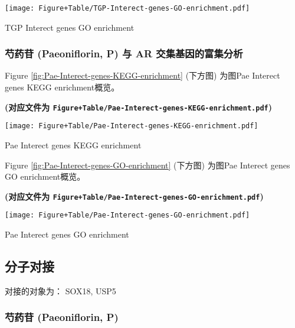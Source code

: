 \documentclass[
]{article}
\begin{document}
\def\@captype{figure}
\begin{center}
\texttt{[image: Figure+Table/TGP-Interect-genes-GO-enrichment.pdf]}
\caption{TGP Interect genes GO enrichment}\label{fig:TGP-Interect-genes-GO-enrichment}
\end{center}

\hypertarget{ux828dux836fux82f7-paeoniflorin-p-ux4e0e-ar-ux4ea4ux96c6ux57faux56e0ux7684ux5bccux96c6ux5206ux6790}{%
\subsubsection{芍药苷 (Paeoniflorin, P) 与 AR 交集基因的富集分析}\label{ux828dux836fux82f7-paeoniflorin-p-ux4e0e-ar-ux4ea4ux96c6ux57faux56e0ux7684ux5bccux96c6ux5206ux6790}}

Figure \ref{fig:Pae-Interect-genes-KEGG-enrichment} (下方图) 为图Pae Interect genes KEGG enrichment概览。

\textbf{(对应文件为 \texttt{Figure+Table/Pae-Interect-genes-KEGG-enrichment.pdf})}

\def\@captype{figure}
\begin{center}
\texttt{[image: Figure+Table/Pae-Interect-genes-KEGG-enrichment.pdf]}
\caption{Pae Interect genes KEGG enrichment}\label{fig:Pae-Interect-genes-KEGG-enrichment}
\end{center}

Figure \ref{fig:Pae-Interect-genes-GO-enrichment} (下方图) 为图Pae Interect genes GO enrichment概览。

\textbf{(对应文件为 \texttt{Figure+Table/Pae-Interect-genes-GO-enrichment.pdf})}

\def\@captype{figure}
\begin{center}
\texttt{[image: Figure+Table/Pae-Interect-genes-GO-enrichment.pdf]}
\caption{Pae Interect genes GO enrichment}\label{fig:Pae-Interect-genes-GO-enrichment}
\end{center}

\hypertarget{ux5206ux5b50ux5bf9ux63a5}{%
\subsection{分子对接}\label{ux5206ux5b50ux5bf9ux63a5}}

对接的对象为： SOX18, USP5

\hypertarget{ux828dux836fux82f7-paeoniflorin-p}{%
\subsubsection{芍药苷 (Paeoniflorin, P)}\label{ux828dux836fux82f7-paeoniflorin-p}}
\end{document}
